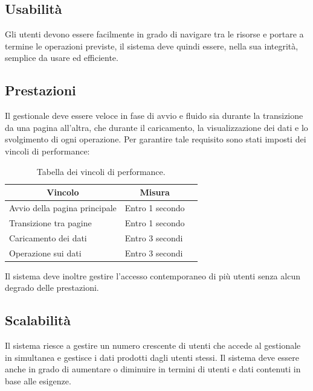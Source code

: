 \subsection{Usabilità}
Gli utenti devono essere facilmente in grado di navigare tra le risorse e portare a termine le operazioni previste, il sistema deve quindi essere, nella sua integrità, semplice da usare ed efficiente. 

\subsection{Prestazioni}
Il gestionale deve essere veloce in fase di avvio e fluido sia durante la transizione da una pagina all'altra, che durante il caricamento, la visualizzazione dei dati e lo svolgimento di ogni operazione.
Per garantire tale requisito sono stati imposti dei vincoli di performance:
\begin{table}[h!]
\centering
\begin{tabular}{|l|l|l|}
\hline
\multicolumn{1}{|c|}{\textbf{Vincolo}} & \multicolumn{1}{c|}{\textbf{Misura}} \\ \hline
Avvio della pagina principale &  Entro 1 secondo\\ \hline
Transizione tra pagine & Entro 1 secondo\\ \hline
Caricamento dei dati & Entro 3 secondi\\ \hline
Operazione sui dati & Entro 3 secondi\\ \hline
\end{tabular}
\caption{Tabella dei vincoli di performance.}
\label{}
\end{table}

Il sistema deve inoltre gestire l'accesso contemporaneo di più utenti senza alcun degrado delle prestazioni.

\subsection{Scalabilità}
Il sistema riesce a gestire un numero crescente di utenti che accede al gestionale in simultanea e gestisce i dati prodotti dagli utenti stessi.     
Il sistema deve essere anche in grado di aumentare o diminuire in termini di utenti e dati contenuti in base alle esigenze.

